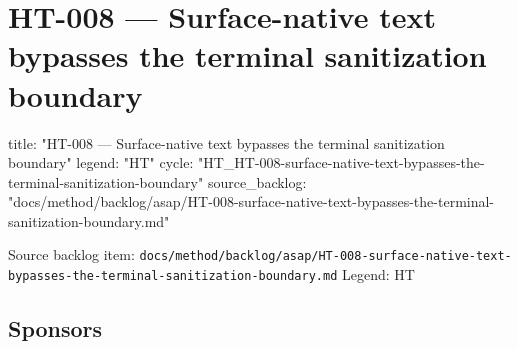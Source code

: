 \chapter{HT-008 --- Surface-native text bypasses the terminal sanitization boundary}\label{record-258}

\smallskip

\begin{RecordMeta}
title: "HT-008 — Surface-native text bypasses the terminal sanitization boundary"
legend: "HT"
cycle: "HT_HT-008-surface-native-text-bypasses-the-terminal-sanitization-boundary"
source_backlog: "docs/method/backlog/asap/HT-008-surface-native-text-bypasses-the-terminal-sanitization-boundary.md"

\end{RecordMeta}

Source backlog item: \texttt{d\allowbreak{}o\allowbreak{}c\allowbreak{}s\allowbreak{}/\allowbreak{}m\allowbreak{}e\allowbreak{}t\allowbreak{}h\allowbreak{}o\allowbreak{}d\allowbreak{}/\allowbreak{}b\allowbreak{}a\allowbreak{}c\allowbreak{}k\allowbreak{}l\allowbreak{}o\allowbreak{}g\allowbreak{}/\allowbreak{}a\allowbreak{}s\allowbreak{}a\allowbreak{}p\allowbreak{}/\allowbreak{}H\allowbreak{}T\allowbreak{}-\allowbreak{}0\allowbreak{}0\allowbreak{}8\allowbreak{}-\allowbreak{}s\allowbreak{}u\allowbreak{}r\allowbreak{}f\allowbreak{}a\allowbreak{}c\allowbreak{}e\allowbreak{}-\allowbreak{}n\allowbreak{}a\allowbreak{}t\allowbreak{}i\allowbreak{}v\allowbreak{}e\allowbreak{}-\allowbreak{}t\allowbreak{}e\allowbreak{}x\allowbreak{}t\allowbreak{}-\allowbreak{}b\allowbreak{}y\allowbreak{}p\allowbreak{}a\allowbreak{}s\allowbreak{}s\allowbreak{}e\allowbreak{}s\allowbreak{}-\allowbreak{}t\allowbreak{}h\allowbreak{}e\allowbreak{}-\allowbreak{}t\allowbreak{}e\allowbreak{}r\allowbreak{}m\allowbreak{}i\allowbreak{}n\allowbreak{}a\allowbreak{}l\allowbreak{}-\allowbreak{}s\allowbreak{}a\allowbreak{}n\allowbreak{}i\allowbreak{}t\allowbreak{}i\allowbreak{}z\allowbreak{}a\allowbreak{}t\allowbreak{}i\allowbreak{}o\allowbreak{}n\allowbreak{}-\allowbreak{}b\allowbreak{}o\allowbreak{}u\allowbreak{}n\allowbreak{}d\allowbreak{}a\allowbreak{}r\allowbreak{}y\allowbreak{}.\allowbreak{}m\allowbreak{}d} Legend: HT

\section{Sponsors}\label{record-258-sponsors}

